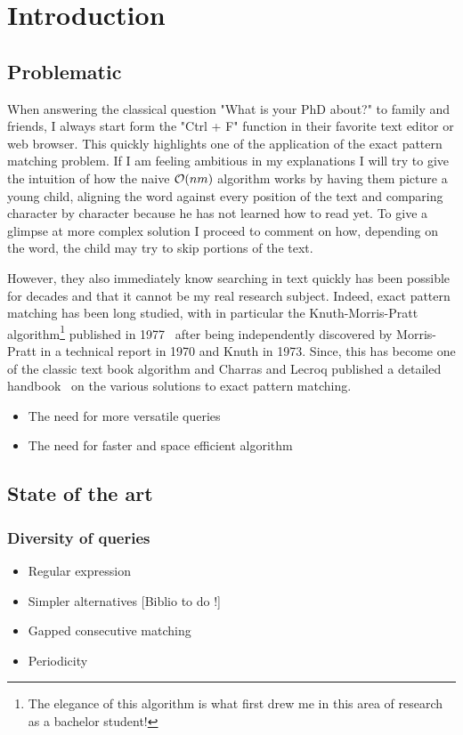 \chapter*{Introduction}

\section{Problematic}

When answering the classical question "What is your PhD about?" to family and friends, I always start form the "Ctrl + F" function in their favorite text editor or web browser. This quickly highlights one of the application of the exact pattern matching problem. If I am feeling ambitious in my explanations I will try to give the intuition of how the naive $\mathcal{O}(nm)$ algorithm works by having them picture a young child, aligning the word against every position of the text and comparing character by character because he has not learned how to read yet. To give a glimpse at more complex solution I proceed to comment on how, depending on the word, the child may try to skip portions of the text.

However, they also immediately know searching in text quickly has been possible for decades and that it cannot be my real research subject. Indeed, exact pattern matching has been long studied, with in particular the Knuth-Morris-Pratt algorithm\footnote{The elegance of this algorithm is what first drew me in this area of research as a bachelor student!} published in 1977~\cite{KMP} after being independently discovered by Morris-Pratt in a technical report in 1970 and Knuth in 1973. Since, this has become one of the classic text book algorithm and Charras and Lecroq published a detailed handbook~\cite{charras2004handbook} on the various solutions to exact pattern matching.


\begin{itemize}
\item The need for more versatile queries
\item The need for faster and space efficient algorithm
\end{itemize}

\section{State of the art}

\subsection{Diversity of queries}
\begin{itemize}
\item Regular expression
\item Simpler alternatives [Biblio to do !]
\item Gapped consecutive matching
\item Periodicity
\end{itemize}

